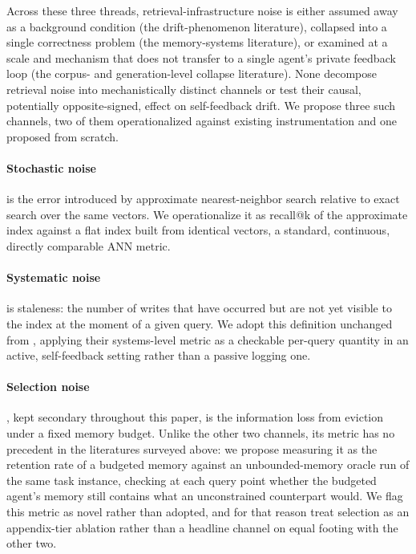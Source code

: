 \documentclass{article}
\begin{document}
Across these three threads, retrieval-infrastructure noise is either assumed away as a background condition (the drift-phenomenon literature), collapsed into a single correctness problem (the memory-systems literature), or examined at a scale and mechanism that does not transfer to a single agent's private feedback loop (the corpus- and generation-level collapse literature). None decompose retrieval noise into mechanistically distinct channels or test their causal, potentially opposite-signed, effect on self-feedback drift. We propose three such channels, two of them operationalized against existing instrumentation and one proposed from scratch.

\paragraph{Stochastic noise} is the error introduced by approximate nearest-neighbor search relative to exact search over the same vectors. We operationalize it as recall@k of the approximate index against a flat index built from identical vectors, a standard, continuous, directly comparable ANN metric.

\paragraph{Systematic noise} is staleness: the number of writes that have occurred but are not yet visible to the index at the moment of a given query. We adopt this definition unchanged from \citet{omri2026agentmemory}, applying their systems-level metric as a checkable per-query quantity in an active, self-feedback setting rather than a passive logging one.

\paragraph{Selection noise}, kept secondary throughout this paper, is the information loss from eviction under a fixed memory budget. Unlike the other two channels, its metric has no precedent in the literatures surveyed above: we propose measuring it as the retention rate of a budgeted memory against an unbounded-memory oracle run of the same task instance, checking at each query point whether the budgeted agent's memory still contains what an unconstrained counterpart would. We flag this metric as novel rather than adopted, and for that reason treat selection as an appendix-tier ablation rather than a headline channel on equal footing with the other two.
\end{document}
